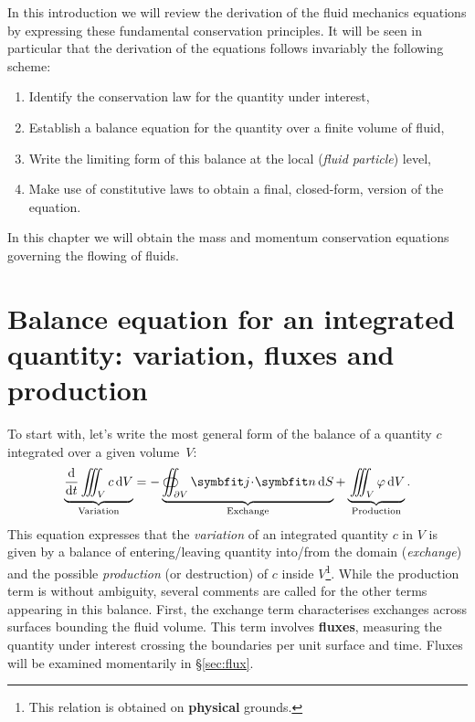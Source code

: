 \noindent In this introduction we will review the derivation of the fluid mechanics equations by expressing these fundamental conservation principles. It will be seen in particular that the derivation of the equations follows invariably the following scheme:
\begin{enumerate}[noitemsep]
\item Identify the conservation law for the quantity under interest,
\item Establish a balance equation for the quantity over a finite volume of fluid,
\item Write the limiting form of this balance at the local (\textit{fluid particle}) level,
\item Make use of constitutive laws to obtain a final, closed-form, version of the equation.
\end{enumerate}
In this chapter we will obtain the mass and momentum conservation equations governing the flowing of fluids.

\section[Balance equation: variation, fluxes and production]{Balance equation for an integrated quantity: variation, fluxes and production}
To start with, let's write the most general form of the balance of a quantity $c$ integrated over a given volume~$V$:
\begin{equation}
\underbrace{\vphantom{\oiint_{\partial V}}\dd{}{t}\iiint_{V}c\, \dV}_\text{Variation} = -\underbrace{\oiint_{\partial V} \bj\!\cdot\!\bn\,\dS}_\text{Exchange} + \underbrace{\vphantom{\oiint_{\partial V}}\iiint_{V} \varphi\,\dV}_\text{Production}.
\label{eq:conservation_law}
\end{equation}
This equation expresses that the \textit{variation} of an integrated quantity $c$ in $V$ is given by a balance of entering/leaving quantity into/from the domain (\textit{exchange}) and the possible \textit{production} (or destruction) of $c$ inside $V$\footnote{This relation is obtained on \textbf{physical} grounds.}.
While the production term is without ambiguity, several comments are called for the other terms appearing in this balance. First, the exchange term characterises exchanges across surfaces bounding the fluid volume. This term involves \textbf{fluxes}, measuring the quantity under interest crossing the boundaries per unit surface and time. Fluxes will be examined momentarily in \S\ref{sec:flux}.

